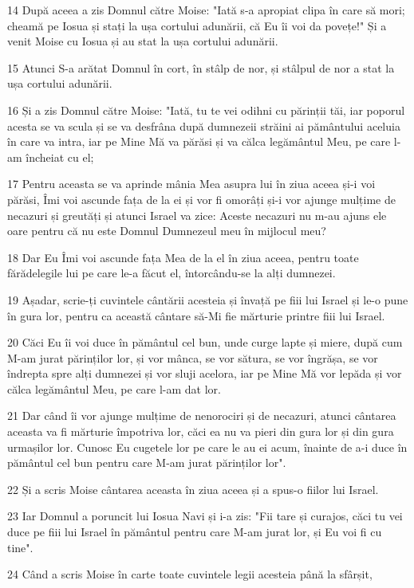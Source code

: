 \par 14 După aceea a zis Domnul către Moise: "Iată s-a apropiat clipa în care să mori; cheamă pe Iosua și stați la ușa cortului adunării, că Eu îi voi da povețe!" Și a venit Moise cu Iosua și au stat la ușa cortului adunării.
\par 15 Atunci S-a arătat Domnul în cort, în stâlp de nor, și stâlpul de nor a stat la ușa cortului adunării.
\par 16 Și a zis Domnul către Moise: "Iată, tu te vei odihni cu părinții tăi, iar poporul acesta se va scula și se va desfrâna după dumnezeii străini ai pământului aceluia în care va intra, iar pe Mine Mă va părăsi și va călca legământul Meu, pe care l-am încheiat cu el;
\par 17 Pentru aceasta se va aprinde mânia Mea asupra lui în ziua aceea și-i voi părăsi, Îmi voi ascunde fața de la ei și vor fi omorâți și-i vor ajunge mulțime de necazuri și greutăți și atunci Israel va zice: Aceste necazuri nu m-au ajuns ele oare pentru că nu este Domnul Dumnezeul meu în mijlocul meu?
\par 18 Dar Eu Îmi voi ascunde fața Mea de la el în ziua aceea, pentru toate fărădelegile lui pe care le-a făcut el, întorcându-se la alți dumnezei.
\par 19 Așadar, scrie-ți cuvintele cântării acesteia și învață pe fiii lui Israel și le-o pune în gura lor, pentru ca această cântare să-Mi fie mărturie printre fiii lui Israel.
\par 20 Căci Eu îi voi duce în pământul cel bun, unde curge lapte și miere, după cum M-am jurat părinților lor, și vor mânca, se vor sătura, se vor îngrășa, se vor îndrepta spre alți dumnezei și vor sluji acelora, iar pe Mine Mă vor lepăda și vor călca legământul Meu, pe care l-am dat lor.
\par 21 Dar când îi vor ajunge mulțime de nenorociri și de necazuri, atunci cântarea aceasta va fi mărturie împotriva lor, căci ea nu va pieri din gura lor și din gura urmașilor lor. Cunosc Eu cugetele lor pe care le au ei acum, înainte de a-i duce în pământul cel bun pentru care M-am jurat părinților lor".
\par 22 Și a scris Moise cântarea aceasta în ziua aceea și a spus-o fiilor lui Israel.
\par 23 Iar Domnul a poruncit lui Iosua Navi și i-a zis: "Fii tare și curajos, căci tu vei duce pe fiii lui Israel în pământul pentru care M-am jurat lor, și Eu voi fi cu tine".
\par 24 Când a scris Moise în carte toate cuvintele legii acesteia până la sfârșit,
